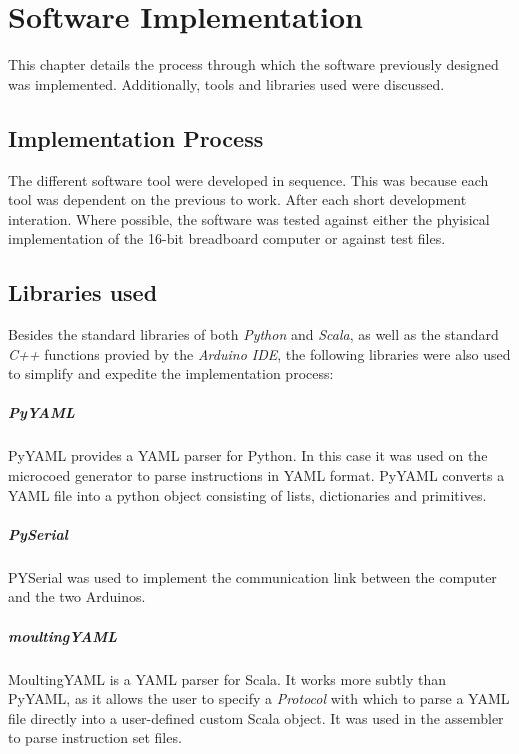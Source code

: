 \chapter{Software Implementation}
This chapter details the process through which the software previously designed
was implemented. Additionally, tools and libraries used were discussed.


\section{Implementation Process}
The different software tool were developed in sequence. This was because
each tool was dependent on the previous to work. After each short development
interation. Where possible, the software was tested against either the phyisical implementation
of the 16-bit breadboard computer or against test files.

\section{Libraries used}
Besides the standard libraries of both \emph{Python} and \emph{Scala}, as well as
the standard \emph{C++} functions provied by the \emph{Arduino IDE}, the following libraries
were also used to simplify and expedite the implementation process:
\paragraph{PyYAML} \cite{pyyaml} PyYAML provides a YAML parser for Python. In this case it was
used on the microcoed generator to parse instructions in YAML format. PyYAML converts a YAML
file into a python object consisting of lists, dictionaries and primitives.

\paragraph{PySerial} \cite{pyserial} PYSerial was used to implement the communication link
between the computer and the two Arduinos.

\paragraph{moultingYAML} \cite{moultingyaml} MoultingYAML is a YAML parser for Scala. It works
more subtly than PyYAML, as it allows the user to specify a \emph{Protocol} with which to
parse a YAML file directly into a user-defined custom Scala object. It was used in the
assembler to parse instruction set files.

